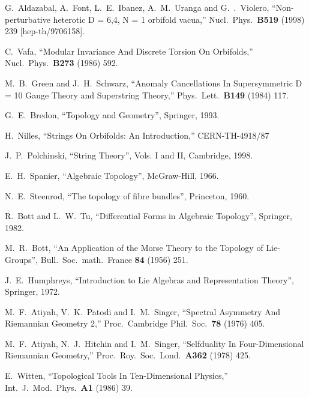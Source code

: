 \documentclass[a4paper,12pt,twoside]{article}
\numberwithin{equation}{section}
\begin{document}
\begin{thebibliography}{xx}
 G.~Aldazabal, A.~Font, L.~E.~Ibanez, A.~M.~Uranga
  and G.~.~Violero, ``Non-perturbative heterotic D = 6,4, N = 1
  orbifold vacua,'' Nucl.\ Phys.\ {\bf B519} (1998) 239
  [hep-th/9706158].

 C.~Vafa, ``Modular Invariance And Discrete
  Torsion On Orbifolds,'' Nucl.\ Phys.\ {\bf B273} (1986) 592.

 M.~B.~Green and J.~H.~Schwarz, ``Anomaly
  Cancellations In Supersymmetric D = 10 Gauge Theory and Superstring
  Theory,'' Phys.\ Lett.\ {\bf B149} (1984) 117.

 G.~E.~Bredon, ``Topology and Geometry'', Springer, 1993.

 H.~Nilles, ``Strings On Orbifolds: An
  Introduction,'' CERN-TH-4918/87

 J.~P.~Polchinski, ``String Theory'', Vols. I and II,
  Cambridge, 1998.
  
 E.~H.~Spanier, ``Algebraic Topology'', McGraw-Hill, 1966.

 N.~E.~Steenrod, ``The topology of fibre bundles'',
  Princeton, 1960.

 R.~Bott and L.~W.~Tu, ``Differential Forms in
  Algebraic Topology'', Springer, 1982.
  
 M.~R.~Bott, ``An Application of the Morse Theory to the
  Topology of Lie-Groups'', Bull.\ Soc.\ math.\ France {\bf 84} (1956)
  251.

 J.~E.~Humphreys, ``Introduction to Lie Algebras
  and Representation Theory'', Springer, 1972.
  
 M.~F.~Atiyah, V.~K.~Patodi and I.~M.~Singer,
  ``Spectral Asymmetry And Riemannian Geometry 2,'' Proc.\ Cambridge
  Phil.\ Soc.\ {\bf 78} (1976) 405.
  
 M.~F.~Atiyah, N.~J.~Hitchin and I.~M.~Singer,
  ``Selfduality In Four-Dimensional Riemannian Geometry,'' Proc.\ 
  Roy.\ Soc.\ Lond.\ {\bf A362} (1978) 425.
  
 E.~Witten, ``Topological Tools In
  Ten-Dimensional Physics,'' Int.\ J.\ Mod.\ Phys.\ {\bf A1} (1986)
  39.

\end{thebibliography}
\end{document}
